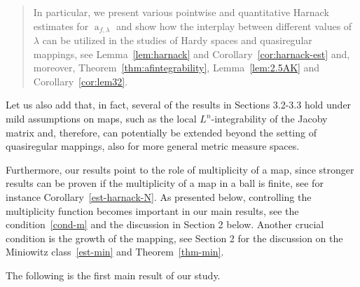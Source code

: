\documentclass[11pt,a4paper,reqno]{amsart}
\theoremstyle{definition}
\renewcommand{\a}{\operatorname{a}}
\numberwithin{komcounter}{section}
\begin{document}
\begin{quote}
In particular, we present various pointwise and quantitative Harnack estimates for $\a_{f, \lambda}$ and show how the interplay between different values of $\lambda$ can be utilized in the studies of Hardy spaces and quasiregular mappings, see Lemma~\ref{lem:harnack} and Corollary~\ref{cor:harnack-est} and, moreover, Theorem~\ref{thm:afintegrability}, Lemma~\ref{lem:2.5AK} and Corollary~\ref{cor:lem32}.
\end{quote}

Let us also add that, in fact, several of the results in Sections 3.2-3.3 hold under mild assumptions on maps, such as the local $L^n$-integrability of the Jacoby matrix and, therefore, can potentially be extended beyond the setting of quasiregular mappings, also for more general metric measure spaces.

 Furthermore, our results point to the role of multiplicity of a map, since stronger results can be proven if the multiplicity of a map in a ball is finite, see for instance Corollary~\ref{est-harnack-N}. As presented below, controlling the multiplicity function becomes important in our main results, see the condition~\eqref{cond-m} and the discussion in Section 2 below.  
Another crucial condition is the growth of the mapping, see Section 2 for the discussion on the Miniowitz class~\eqref{est-min} and Theorem~\ref{thm-min}.
%

The following is the first main result of our study.
\end{document}
